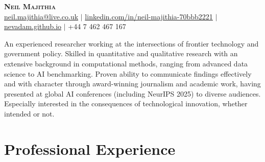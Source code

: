 \documentclass[a4paper,10pt]{article}
\begin{document}

\begin{center}
    {\LARGE \textsc{\color{squareone}\textbf{Neil Majithia}}} \\
    \href{mailto:neil.majithia@live.co.uk}{neil.majithia@live.co.uk} $\vert$ \href{https://www.linkedin.com/in/neil-majithia-70bbb2221/}{linkedin.com/in/neil-majithia-70bbb2221} $\vert$ \href{nevadam.github.io}{nevadam.github.io} $\vert$ +44 7 462 467 167
\end{center}

An experienced researcher working at the intersections of frontier technology and government policy. Skilled in quantitative and qualitative research with an extensive background in computational methods, ranging from advanced data science to AI benchmarking. Proven ability to communicate findings effectively and with character through award-winning journalism and academic work, having presented at global AI conferences (including NeurIPS 2025) to diverse audiences. Especially interested in the consequences of technological innovation, whether intended or not. 

\section*{Professional Experience}
\end{document}
